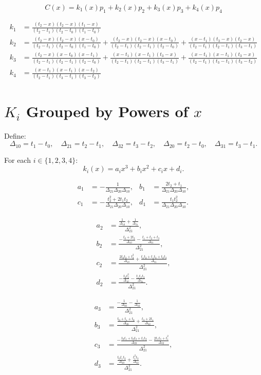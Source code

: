 \documentclass[11pt]{article}
\begin{document}
\[
C(x)=k_1(x)p_1+k_2(x)p_2+k_3(x)p_3+k_4(x)p_4
\]

\begin{align*}
k_1&=\frac{(t_2-x)(t_2-x)(t_1-x)}{(t_2-t_1)(t_2-t_0)(t_1-t_0)} \\
k_2&=
\frac{(t_2-x)(t_2-x)(x-t_0)}{(t_2-t_1)(t_2-t_0)(t_1-t_0)}
+\frac{(t_2-x)(t_2-x)(x-t_0)}{(t_2-t_1)(t_2-t_1)(t_2-t_0)}
+\frac{(x-t_1)(t_3-x)(t_2-x)}{(t_2-t_1)(t_2-t_1)(t_3-t_1)} \\
k_3&=
\frac{(t_2-x)(x-t_0)(x-t_1)}{(t_2-t_1)(t_2-t_1)(t_2-t_0)}
+\frac{(x-t_1)(x-t_1)(t_3-x)}{(t_2-t_1)(t_2-t_1)(t_3-t_1)}
+\frac{(x-t_1)(x-t_1)(t_3-x)}{(t_2-t_1)(t_3-t_1)(t_3-t_2)} \\
k_4&=\frac{(x-t_1)(x-t_1)(x-t_2)}{(t_2-t_1)(t_3-t_1)(t_3-t_2)}
\end{align*}

\section*{$K_i$ Grouped by Powers of $x$}

Define:
\[
\Delta_{10}=t_1-t_0,\quad
\Delta_{21}=t_2-t_1,\quad
\Delta_{32}=t_3-t_2,\quad
\Delta_{20}=t_2-t_0,\quad
\Delta_{31}=t_3-t_1.
\]

For each $i\in\{1,2,3,4\}$:
\[
k_i(x)=a_i x^3+b_i x^2+c_i x+d_i.
\]

\begin{align*}
a_1&=-\frac{1}{\Delta_{21}\Delta_{20}\Delta_{10}},&
b_1&=\frac{2t_2+t_1}{\Delta_{21}\Delta_{20}\Delta_{10}},\\
c_1&=-\frac{t_2^2+2t_1t_2}{\Delta_{21}\Delta_{20}\Delta_{10}},&
d_1&=\frac{t_1t_2^2}{\Delta_{21}\Delta_{20}\Delta_{10}}.
\end{align*}

\begin{align*}
a_2&=\frac{\frac{1}{\Delta_{10}}+\frac{1}{\Delta_{31}}}{\Delta_{21}^2},\\
b_2&=\frac{-\frac{t_0+2t_2}{\Delta_{10}}-\frac{t_1+t_2+t_3}{\Delta_{31}}}{\Delta_{21}^2},\\
c_2&=\frac{\frac{2t_0t_2+t_2^2}{\Delta_{10}}+\frac{t_1t_2+t_1t_3+t_2t_3}{\Delta_{31}}}{\Delta_{21}^2},\\
d_2&=\frac{-\frac{t_0t_2^2}{\Delta_{10}}-\frac{t_1t_2t_3}{\Delta_{31}}}{\Delta_{21}^2}.
\end{align*}

\begin{align*}
a_3&=\frac{-\frac{1}{\Delta_{20}}-\frac{1}{\Delta_{32}}}{\Delta_{21}^2},\\
b_3&=\frac{\frac{t_0+t_1+t_2}{\Delta_{20}}+\frac{t_3+2t_1}{\Delta_{32}}}{\Delta_{21}^2},\\
c_3&=\frac{-\frac{t_0t_1+t_0t_2+t_1t_2}{\Delta_{20}}-\frac{2t_1t_3+t_1^2}{\Delta_{32}}}{\Delta_{21}^2},\\
d_3&=\frac{\frac{t_0t_1t_2}{\Delta_{20}}+\frac{t_1^2t_3}{\Delta_{32}}}{\Delta_{21}^2}.
\end{align*}
\end{document}

